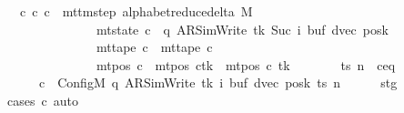 \begin{isabellebody}
\ \ \ {\isachardoublequoteopen}{\isasymexists}c{\isacharprime}{\kern0pt}{\isacharprime}{\kern0pt}{\isachardot}{\kern0pt}\ {\isacharparenleft}{\kern0pt}c{\isacharprime}{\kern0pt}{\isacharcomma}{\kern0pt}\ c{\isacharprime}{\kern0pt}{\isacharprime}{\kern0pt}{\isacharparenright}{\kern0pt}\ {\isasymin}\ mttm{\isacharunderscore}{\kern0pt}step\ {\isacharparenleft}{\kern0pt}alphabet{\isacharunderscore}{\kern0pt}reduce{\isacharunderscore}{\kern0pt}delta\ M{\isacharparenright}{\kern0pt}\isanewline
\ \ \ \ \ \ \ \ \ \ \ \ \ \ {\isasymand}\ mt{\isacharunderscore}{\kern0pt}state\ c{\isacharprime}{\kern0pt}{\isacharprime}{\kern0pt}\ {\isacharequal}{\kern0pt}\ {\isacharparenleft}{\kern0pt}q{\isacharcomma}{\kern0pt}\ AR{\isacharunderscore}{\kern0pt}SimWrite{\isacharcomma}{\kern0pt}\ tk{\isacharcomma}{\kern0pt}\ Suc\ i{\isacharcomma}{\kern0pt}\ buf{\isacharcomma}{\kern0pt}\ dvec{\isacharcomma}{\kern0pt}\ posk{\isacharparenright}{\kern0pt}\isanewline
\ \ \ \ \ \ \ \ \ \ \ \ \ \ {\isasymand}\ mt{\isacharunderscore}{\kern0pt}tape\ c{\isacharprime}{\kern0pt}{\isacharprime}{\kern0pt}\ {\isacharequal}{\kern0pt}\ mt{\isacharunderscore}{\kern0pt}tape\ c{\isacharprime}{\kern0pt}\isanewline
\ \ \ \ \ \ \ \ \ \ \ \ \ \ {\isasymand}\ mt{\isacharunderscore}{\kern0pt}pos\ c{\isacharprime}{\kern0pt}{\isacharprime}{\kern0pt}\ {\isacharequal}{\kern0pt}\ {\isacharparenleft}{\kern0pt}mt{\isacharunderscore}{\kern0pt}pos\ c{\isacharprime}{\kern0pt}{\isacharparenright}{\kern0pt}{\isacharparenleft}{\kern0pt}tk\ {\isacharcolon}{\kern0pt}{\isacharequal}{\kern0pt}\ mt{\isacharunderscore}{\kern0pt}pos\ c{\isacharprime}{\kern0pt}\ tk\ {\isacharminus}{\kern0pt}\ {}{\isacharparenright}{\kern0pt}{\isachardoublequoteclose}\isanewline
%
\isadelimproof
%
\endisadelimproof
%
\isatagproof
{}\isamarkupfalse%
\ {\isacharminus}{\kern0pt}\isanewline
\ \ \isamarkupfalse%
\ ts\ n\ \ c{\isacharprime}{\kern0pt}{\isacharunderscore}{\kern0pt}eq{\isacharcolon}{\kern0pt}\isanewline
\ \ \ \ \ \ {\isachardoublequoteopen}c{\isacharprime}{\kern0pt}\ {\isacharequal}{\kern0pt}\ Config\isactrlsub M\ {\isacharparenleft}{\kern0pt}q{\isacharcomma}{\kern0pt}\ AR{\isacharunderscore}{\kern0pt}SimWrite{\isacharcomma}{\kern0pt}\ tk{\isacharcomma}{\kern0pt}\ i{\isacharcomma}{\kern0pt}\ buf{\isacharcomma}{\kern0pt}\ dvec{\isacharcomma}{\kern0pt}\ posk{\isacharparenright}{\kern0pt}\ ts\ n{\isachardoublequoteclose}\isanewline
\ \ \ \ \isamarkupfalse%
\ stg\ \isamarkupfalse%
\ {\isacharparenleft}{\kern0pt}cases\ c{\isacharprime}{\kern0pt}{\isacharparenright}{\kern0pt}\ auto\isanewline

\end{isabellebody}
